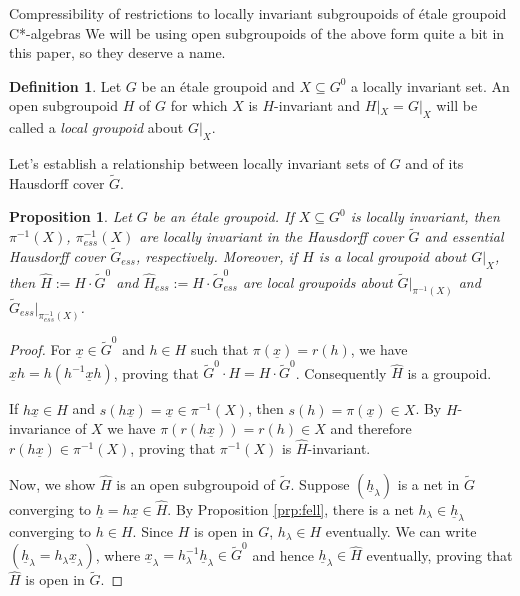\documentclass[a4paper, 12pt]{amsart}
\newtheorem{prp}[thm]{Proposition}
\theoremstyle{definition}
\newtheorem{dfn}[thm]{Definition}
\theoremstyle{remark}
\numberwithin{equation}{section}
\begin{document}
\begin{section}{Compressibility of restrictions to locally invariant subgroupoids of \'etale groupoid C*-algebras}
We will be using open subgroupoids of the above form quite a bit in this paper, so they deserve a name.

\begin{dfn}
\label{dfn:hull}
    Let $G$ be an \'etale groupoid and $X\subseteq G^{0}$ a locally invariant set. An open subgroupoid $H$ of $G$ for which $X$ is $H$-invariant and $H|_{X} = G|_{X}$ will be called a \emph{local groupoid} about $G|_{X}$.
\end{dfn}

Let's establish a relationship between locally invariant sets of $G$ and of its Hausdorff cover $\tilde{G}$.

\begin{prp}
\label{prp:locinvar&cover}
    Let $G$ be an \'etale groupoid. If $X\subseteq G^{0}$ is locally invariant, then $\pi^{-1}(X)$, $\pi_{ess}^{-1}(X)$ are locally invariant in the Hausdorff cover $\tilde{G}$ and essential Hausdorff cover $\tilde{G}_{ess}$, respectively. Moreover, if $H$ is a local groupoid about $G|_{X}$, then $\hat{H} := H\cdot \tilde{G}^{0}$ and $\hat{H}_{ess} := H\cdot \tilde{G}^{0}_{ess}$ are local groupoids about $\tilde{G}|_{\pi^{-1}(X)}$ and  $\tilde{G}_{ess}|_{\pi_{ess}^{-1}(X)}$.
\end{prp}

\begin{proof}
    For $\underline{x}\in \tilde{G}^{0}$ and $h\in H$ such that $\pi(\underline{x}) = r(h)$, we have $\underline{x}h = h(h^{-1}\underline{x}h)$, proving that $\tilde{G}^{0}\cdot H = H\cdot \tilde{G}^{0}$. Consequently $\hat{H}$ is a groupoid. 
    
    If $h\underline{x}\in \hat{H}$ and $s(h\underline{x}) = \underline{x}\in \pi^{-1}(X)$, then $s(h) = \pi(\underline{x})\in X$. By $H$-invariance of $X$ we have $\pi(r(h\underline{x})) = r(h)\in X$ and therefore $r(h\underline{x})\in \pi^{-1}(X)$, proving that $\pi^{-1}(X)$ is $\hat{H}$-invariant.

    Now, we show $\hat{H}$ is an open subgroupoid of $\tilde{G}$. Suppose $(\underline{h}_{\lambda})$ is a net in $\tilde{G}$ converging to $\underline{h} = h\underline{x}\in \hat{H}$. By Proposition \ref{prp:fell}, there is a net $h_{\lambda}\in \underline{h}_{\lambda}$ converging to $h\in H$. Since $H$ is open in $G$, $h_{\lambda}\in H$ eventually. We can write $(\underline{h}_{\lambda} = h_{\lambda}\underline{x}_{\lambda})$, where $\underline{x}_{\lambda} = h^{-1}_{\lambda}\underline{h}_{\lambda}\in \tilde{G}^{0}$ and hence $\underline{h}_{\lambda}\in \hat{H}$ eventually, proving that $\hat{H}$ is open in $\tilde{G}$.


\end{proof}
\end{section}
\end{document}
